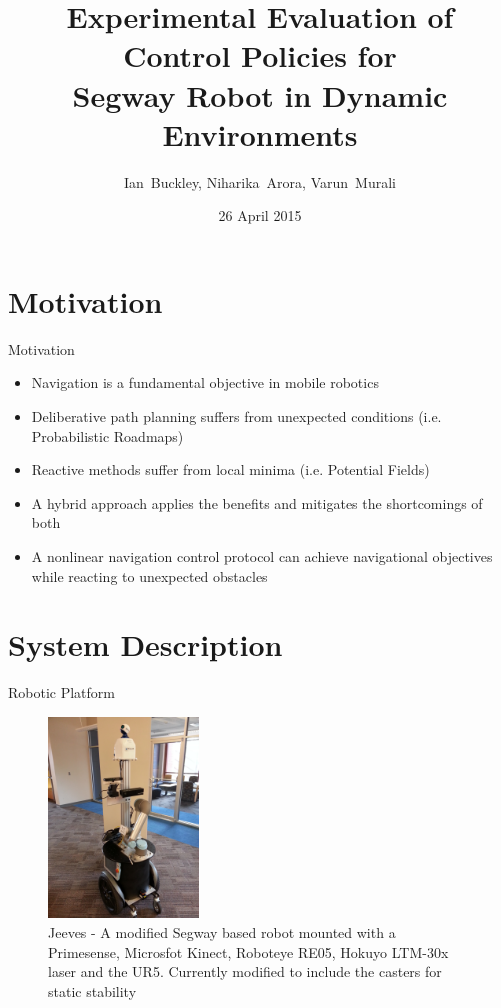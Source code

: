 \documentclass[10pt]{beamer}
\title{Experimental Evaluation of Control Policies for \\Segway Robot in Dynamic Environments }
\author{Ian~Buckley, Niharika~Arora, Varun~Murali}
\date{26 April 2015}
\institute{ECE 6552: Nonlinear System Project}
\begin{document}
\maketitle
\section{Motivation}
\begin{frame}{Motivation}
\begin{itemize}
\item<1-> Navigation is a fundamental objective in mobile robotics
\item<2-> Deliberative path planning suffers from unexpected conditions (i.e. Probabilistic Roadmaps)
\item<3-> Reactive methods suffer from local minima (i.e. Potential Fields)
\item<4-> A hybrid approach applies the benefits and mitigates the shortcomings of both
\item<5-> A nonlinear navigation control protocol can achieve navigational objectives while reacting to unexpected obstacles 
\end{itemize}
\end{frame}

\section{System Description}
\begin{frame}{Robotic Platform}
\begin{figure}
    \centering
    \includegraphics[width = 4cm, scale=0.2]{jeeves2_0.jpg}
    \caption{Jeeves - A modified Segway based robot mounted with a Primesense, Microsfot Kinect, Roboteye RE05, Hokuyo LTM-30x laser and the UR5. Currently modified to include the casters for static stability
    \label{fig:jeeves}}
\end{figure}
\end{frame}
\end{document}
